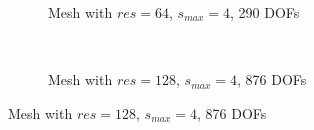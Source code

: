 \begin{figure}[!ht]
    \begin{subfigure}[b]{1\linewidth}
        \centering
        \caption{Mesh with $res=64$, $s_{max}=4$, 290 DOFs}
    \end{subfigure}
    \\
    \begin{subfigure}[b]{1\linewidth}
        \centering
        \caption{Mesh with $res=128$, $s_{max}=4$, 876 DOFs}
    \end{subfigure}
\end{figure}
